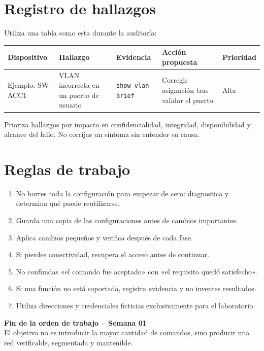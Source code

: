 \documentclass[12pt,a4paper]{article}
\begin{document}
\section{Registro de hallazgos}
Utiliza una tabla como esta durante la auditoría:
\begin{longtable}{p{2.4cm}p{2.8cm}p{2.7cm}p{3.1cm}p{1.5cm}}
\toprule
\textbf{Dispositivo} & \textbf{Hallazgo} & \textbf{Evidencia} & \textbf{Acción propuesta} & \textbf{Prioridad} \\
\midrule
Ejemplo: SW-ACC1 & VLAN incorrecta en un puerto de usuario & \texttt{show vlan brief} & Corregir asignación tras validar el puerto & Alta \\
\bottomrule
\end{longtable}

Prioriza hallazgos por impacto en confidencialidad, integridad, disponibilidad y alcance del fallo. No corrijas un síntoma sin entender su causa.

\section{Reglas de trabajo}
\begin{enumerate}[leftmargin=1.2cm]
 \item No borres toda la configuración para empezar de cero: diagnostica y determina qué puede reutilizarse.
 \item Guarda una copia de las configuraciones antes de cambios importantes.
 \item Aplica cambios pequeños y verifica después de cada fase.
 \item Si pierdes conectividad, recupera el acceso antes de continuar.
 \item No confundas «el comando fue aceptado» con «el requisito quedó satisfecho».
 \item Si una función no está soportada, registra evidencia y no inventes resultados.
 \item Utiliza direcciones y credenciales ficticias exclusivamente para el laboratorio.
\end{enumerate}

\vfill
\begin{center}
\textcolor{azul}{\textbf{Fin de la orden de trabajo -- Semana 01}}\\
\small El objetivo no es introducir la mayor cantidad de comandos, sino producir una red verificable, segmentada y mantenible.
\end{center}
\end{document}
